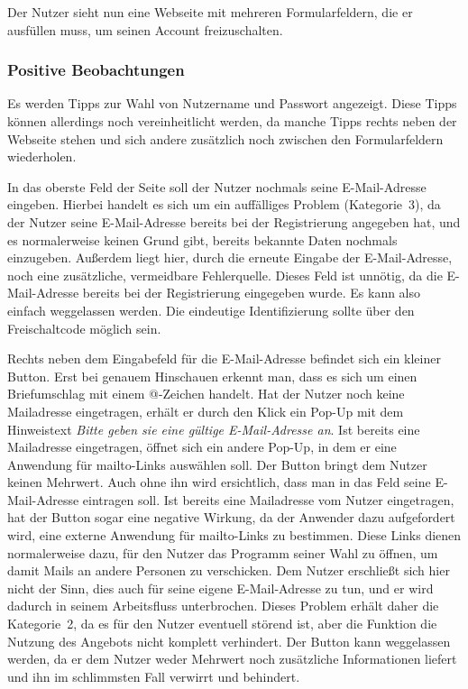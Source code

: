 Der Nutzer sieht nun eine Webseite mit mehreren Formularfeldern, die er ausfüllen muss, um seinen Account freizuschalten.

\subsubsection*{Positive Beobachtungen}
\label{subsubsec:freischaltung_webseite_positiv}
Es werden Tipps zur Wahl von Nutzername und Passwort angezeigt. Diese Tipps können allerdings noch vereinheitlicht werden, da manche Tipps rechts neben der Webseite stehen und sich andere zusätzlich noch zwischen den Formularfeldern wiederholen.

{
In das oberste Feld der Seite soll der Nutzer nochmals seine E\hbox{-}Mail-Adresse eingeben.
}
{
Hierbei handelt es sich um ein auffälliges Problem (Kategorie~3), da der Nutzer seine E\hbox{-}Mail-Adresse bereits bei der Registrierung angegeben hat, und es normalerweise keinen Grund gibt, bereits bekannte Daten nochmals einzugeben. Außerdem liegt hier, durch die erneute Eingabe der E\hbox{-}Mail-Adresse, noch eine zusätzliche, vermeidbare Fehlerquelle.
}
{
Dieses Feld ist unnötig, da die E\hbox{-}Mail-Adresse bereits bei der Registrierung eingegeben wurde. Es kann also einfach weggelassen werden. Die eindeutige Identifizierung sollte über den Freischaltcode möglich sein.
}
\label{prob:frei:emaileingabe}

{
Rechts neben dem Eingabefeld für die E\hbox{-}Mail-Adresse befindet sich ein kleiner Button. Erst bei genauem Hinschauen erkennt man, dass es sich um einen Briefumschlag mit einem @-Zeichen handelt. Hat der Nutzer noch keine Mailadresse eingetragen, erhält er durch den Klick ein Pop-Up mit dem Hinweistext \emph{ Bitte geben sie eine gültige E\hbox{-}Mail-Adresse an}. Ist bereits eine Mailadresse eingetragen, öffnet sich ein andere Pop-Up, in dem er eine Anwendung für mailto-Links auswählen soll.
}
{
Der Button bringt dem Nutzer keinen Mehrwert. Auch ohne ihn wird ersichtlich, dass man in das Feld seine E\hbox{-}Mail-Adresse eintragen soll. Ist bereits eine Mailadresse vom Nutzer eingetragen, hat der Button sogar eine negative Wirkung, da der Anwender dazu aufgefordert wird, eine externe Anwendung für mailto-Links zu bestimmen. Diese Links dienen normalerweise dazu, für den Nutzer das Programm seiner Wahl zu öffnen, um damit Mails an andere Personen zu verschicken. Dem Nutzer erschließt sich hier nicht der Sinn, dies auch für seine eigene E\hbox{-}Mail-Adresse zu tun, und er wird dadurch in seinem Arbeitsfluss unterbrochen. Dieses Problem erhält daher die Kategorie~2, da es für den Nutzer eventuell störend ist, aber die Funktion die Nutzung des Angebots nicht komplett verhindert.
}
{
Der Button kann weggelassen werden, da er dem Nutzer weder Mehrwert noch zusätzliche Informationen liefert und ihn im schlimmsten Fall verwirrt und behindert.
}
\label{prob:frei:buttonmailto}

